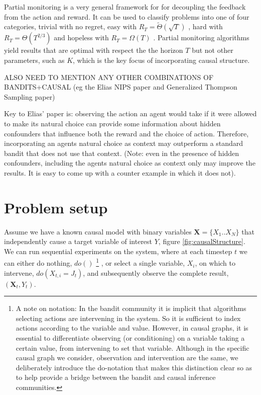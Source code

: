 \documentclass{article}
\newcommand{\bigtheta}[1]{\Theta\left( #1 \right)}
\newcommand{\bigthetatilde}[1]{\tilde{\Theta}\left( #1 \right)}
\newcommand{\bigomega}[1]{\Omega\left( #1 \right)}
\theoremstyle{plain}
\theoremstyle{definition}
\begin{document}
Partial monitoring is a very general framework for for decoupling the feedback from the action and reward. It can be used to classify problems into one of four categories, trivial with no regret, easy with $R_T = \bigthetatilde{\sqrt{T}}$ , hard with $R_T = \bigtheta{T^{2/3}}$ and hopeless with $R_T = \bigomega{T}$ \cite{Bartok2014}. Partial monitoring algorithms yield results that are optimal with respect the the horizon $T$ but not other parameters, such as $K$, which is the key focus of incorporating causal structure. 

ALSO NEED TO MENTION ANY OTHER COMBINATIONS OF BANDITS+CAUSAL (eg the Elias NIPS paper and Generalized Thompson Sampling paper)

Key to Elias' paper is: observing the action an agent would take if it were allowed to make its natural choice can provide some information about hidden confounders that influence both the reward and the choice of action. Therefore, incorporating an agents natural choice as context may outperform a standard bandit that does not use that context. (Note: even in the presence of hidden confounders, including the agents natural choice as context only may improve the results. It is easy to come up with a counter example in which it does not).

\section{Problem setup}

Assume we have a known causal model with binary variables $\boldsymbol{X} = \{X_{1}..X_{N}\}$ that independently cause a target variable of interest $Y$, figure \ref{fig:causalStructure}. We can run sequential experiments on the system, where at each timestep $t$ we can either do nothing, $do()$ \footnote{A note on notation: In the bandit community it is implicit that algorithms selecting actions are intervening in the system. So it is sufficient to index actions according to the variable and value. However, in causal graphs, it is essential to differentiate observing (or conditioning) on a variable taking a certain value, from intervening to set that variable. Although in the specific causal graph we consider, observation and intervention are the same, we deliberately introduce the do-notation \cite{Pearl2000} that makes this distinction clear so as to help provide a bridge between the bandit and causal inference communities.} , or select a single variable, $X_i$, on which to intervene, $do(X_{t,i} = J_t)$, and subsequently observe the complete result, $(\boldsymbol{X}_{t},Y_{t})$. 
\end{document}
